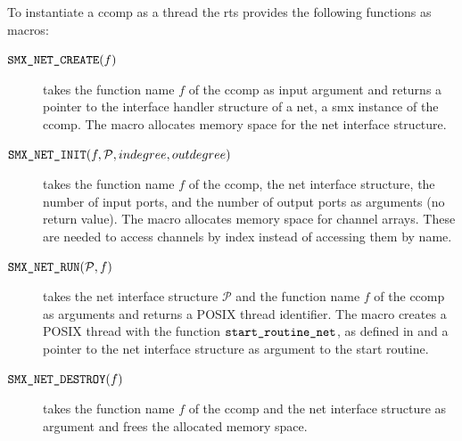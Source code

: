 To instantiate a \gls*{ccomp} as a thread the \gls{rts} provides the following functions as macros:
\begin{description}
    \item[$\textnormal{\tt SMX\_NET\_CREATE}( f )$] takes the function name $f$ of the \gls*{ccomp} as input argument and returns a pointer to the interface handler structure of a net, \ie a \gls*{smx} instance of the \gls*{ccomp}.
        The macro allocates memory space for the net interface structure.
    \item[$\textnormal{\tt SMX\_NET\_INIT}( f, \mathcal{P}, indegree, outdegree )$] takes the function name $f$ of the \gls*{ccomp}, the net interface structure, the number of input ports, and the number of output ports as arguments (no return value).
        The macro allocates memory space for channel arrays.
        These are needed to access channels by index instead of accessing them by name.
    \item[$\textnormal{\tt SMX\_NET\_RUN}(\mathcal{P}, f)$] takes the net interface structure $\mathcal{P}$ and the function name $f$ of the \gls*{ccomp} as arguments and returns a POSIX thread identifier.
        The macro creates a POSIX thread with the function $\textnormal{\tt start\_routine\_net}$, as defined in \Alg{\ref{alg_rts_thread},} and a pointer to the net interface structure as argument to the start routine.
    \item[$\textnormal{\tt SMX\_NET\_DESTROY}(f)$] takes the function name $f$ of the \gls*{ccomp} and the net interface structure as argument and frees the allocated memory space.
\end{description}

